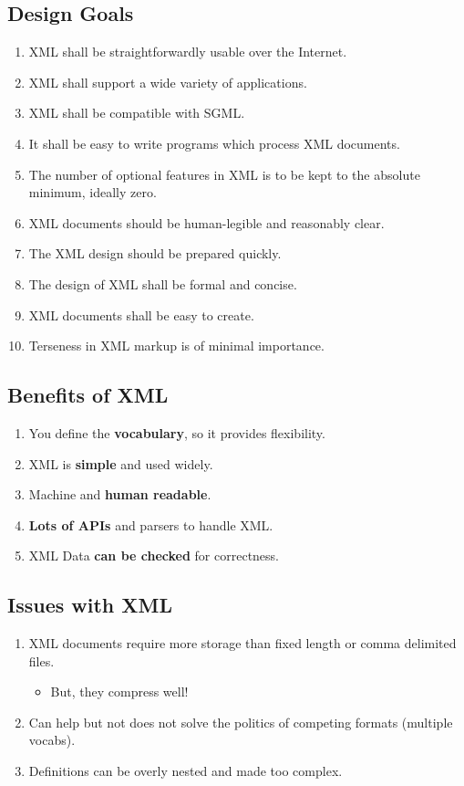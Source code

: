 \documentclass[slides]{pgnotes}
\begin{document}
\inputminted{xml}{intro.xml}

\subsection{Design Goals}

\begin{enumerate}
\item XML shall be straightforwardly usable over the Internet.
\item XML shall support a wide variety of applications.
\item XML shall be compatible with SGML.
\item It shall be easy to write programs which process XML documents.
\item The number of optional features in XML is to be kept to the absolute minimum, ideally zero.
\item XML documents should be human-legible and reasonably clear.
\item The XML design should be prepared quickly.
\item The design of XML shall be formal and concise.
\item XML documents shall be easy to create.
\item Terseness in XML markup is of minimal importance.
\end{enumerate}

 

\subsection{Benefits of XML}

\begin{enumerate}
\item You define the \textbf{vocabulary}, so it provides flexibility.
\item XML is \textbf{simple} and used widely.
\item Machine and \textbf{human readable}.
\item \textbf{Lots of APIs} and parsers to handle XML. 
\item XML Data \textbf{can be checked} for correctness.
\end{enumerate}

\subsection{Issues with XML}

\begin{enumerate}
\item XML documents require more storage than fixed length or comma delimited files.
  \begin{itemize}
  \item But, they compress well!
  \end{itemize}
\item Can help but not does not solve the politics of competing formats (multiple vocabs).
\item Definitions can be overly nested and made too complex.
\end{enumerate}
 
\end{document}

